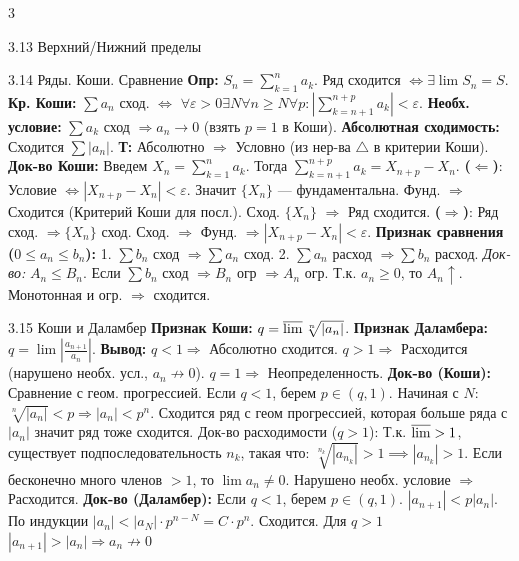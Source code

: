 \documentclass[8pt, a4paper, landscape]{extarticle}
\newcommand{\Ra}{\Rightarrow}
\newcommand{\eps}{\varepsilon}
\begin{document}
\begin{multicols*}{3}
\begin{ticket}{3.13 Верхний/Нижний пределы}
\end{ticket}

\begin{ticket}{3.14 Ряды. Коши. Сравнение}
\textbf{Опр:} $S_n = \sum_{k=1}^n a_k$. Ряд сходится $\iff \exists \lim S_n = S$.
\textbf{Кр. Коши:} $\sum a_n$ сход. $\iff$
$\forall \eps > 0 \exists N \forall n \ge N \forall p: |\sum_{k=n+1}^{n+p} a_k| < \eps$.
\textbf{Необх. условие:} $\sum a_k$ сход $\Ra a_n \to 0$ (взять $p=1$ в Коши).
\textbf{Абсолютная сходимость:} Сходится $\sum |a_n|$.
\textbf{Т:} Абсолютно $\Ra$ Условно (из нер-ва $\triangle$ в критерии Коши).
\tcblower
\textbf{Док-во Коши:}
Введем $X_n = \sum_{k=1}^n a_k$.
Тогда $\sum_{k=n+1}^{n+p} a_k = X_{n+p} - X_n$.
\textbf{($\Leftarrow$)}: Условие $\iff |X_{n+p} - X_n| < \eps$.
Значит $\{X_n\}$ — фундаментальна.
Фунд. $\Ra$ Сходится (Критерий Коши для посл.).
Сход. $\{X_n\}$ $\Ra$ Ряд сходится.
\textbf{($\Rightarrow$)}: Ряд сход. $\Ra \{X_n\}$ сход.
Сход. $\Ra$ Фунд. $\Ra |X_{n+p} - X_n| < \eps$.
\textbf{Признак сравнения ($0 \le a_n \le b_n$):}
1. $\sum b_n$ сход $\Ra \sum a_n$ сход.
2. $\sum a_n$ расход $\Ra \sum b_n$ расход.
\textit{Док-во:} $A_n \le B_n$.
Если $\sum b_n$ сход $\Ra B_n$ огр $\Ra A_n$ огр.
Т.к. $a_n \ge 0$, то $A_n \uparrow$.
Монотонная и огр. $\Ra$ сходится.
\end{ticket}

\begin{ticket}{3.15 Коши и Даламбер}
\textbf{Признак Коши:} $q = \varlimsup \sqrt[n]{|a_n|}$.
\textbf{Признак Даламбера:} $q = \lim |\frac{a_{n+1}}{a_n}|$.
\textbf{Вывод:}
$q < 1 \Ra$ Абсолютно сходится.
$q > 1 \Ra$ Расходится (нарушено необх. усл., $a_n \not\to 0$).
$q = 1 \Ra$ Неопределенность.
\tcblower
\textbf{Док-во (Коши):}
Сравнение с геом. прогрессией.
Если $q < 1$, берем $p \in (q, 1)$. Начиная с $N$: $\sqrt[n]{|a_n|} < p \Ra |a_n| < p^n$. Сходится ряд с геом прогрессией, которая больше ряда с $|a_n|$ значит ряд тоже сходится.
Док-во расходимости ($q > 1$):
Т.к. $\varlimsup > 1$, существует подпоследовательность $n_k$, такая что:
$\sqrt[n_k]{|a_{n_k}|} > 1 \implies |a_{n_k}| > 1$.
Если бесконечно много членов $>1$, то $\lim a_n \ne 0$.
Нарушено необх. условие $\Ra$ Расходится.
\textbf{Док-во (Даламбер):}
Если $q < 1$, берем $p \in (q, 1)$. $|a_{n+1}| < p|a_n|$.
По индукции $|a_n| < |a_N| \cdot p^{n-N} = C \cdot p^n$. Сходится.
Для $q>1$ $|a_{n+1}|>|a_n| \Rightarrow a_n \not\to 0$
\end{ticket}


\end{multicols*}
\end{document}
